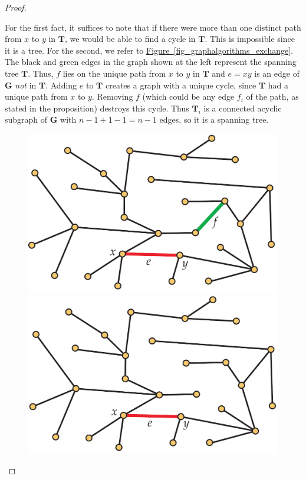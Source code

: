 \documentclass[10pt,]{book}
\theoremstyle{plain}
\theoremstyle{definition}
\theoremstyle{definition}
\theoremstyle{definition}
\theoremstyle{definition}
\numberwithin{equation}{section}
\newlength{\panelmax}
\newcommand{\bfG}{\mathbf{G}}
\newcommand{\bfT}{\mathbf{T}}
\begin{document}
\begin{proof}\hypertarget{proof-6}{}
\hypertarget{p-171}{}%
For the first fact, it suffices to note that if there were more than one distinct path from \(x\) to \(y\) in \(\bfT\), we would be able to find a cycle in \(\bfT\). This is impossible since it is a tree. For the second, we refer to \hyperref[fig_graphalgorithms_exchange]{Figure~\ref{fig_graphalgorithms_exchange}}. The black and green edges in the graph shown at the left represent the spanning tree \(\bfT\). Thus, \(f\) lies on the unique path from \(x\) to \(y\) in \(\bfT\) and \(e=xy\) is an edge of \(\bfG\) \emph{not} in \(\bfT\). Adding \(e\) to \(\bfT\) creates a graph with a unique cycle, since \(\bfT\) had a unique path from \(x\) to \(y\). Removing \(f\) (which could be any edge \(f_i\) of the path, as stated in the proposition) destroys this cycle. Thus \(\bfT_i\) is a connected acyclic subgraph of \(\bfG\) with \(n-1+1-1=n-1\) edges, so it is a spanning tree.%
\begin{figure}
\centering
{%
\setlength{\panelmax}{0pt}
\ifdefined\panelboxAimage\else\newsavebox{\panelboxAimage}\fi%
\begin{lrbox}{\panelboxAimage}
\includegraphics[width=0.48\linewidth]{images/exchange1}
\end{lrbox}
\ifdefined\phAimage\else\newlength{\phAimage}\fi%
\setlength{\phAimage}{\ht\panelboxAimage+\dp\panelboxAimage}
\settototalheight{\phAimage}{\usebox{\panelboxAimage}}
\setlength{\panelmax}{\maxof{\panelmax}{\phAimage}}
\ifdefined\panelboxBimage\else\newsavebox{\panelboxBimage}\fi%
\begin{lrbox}{\panelboxBimage}
\includegraphics[width=0.48\linewidth]{images/exchange2}

\end{lrbox}}
\end{figure}
\end{proof}
\end{document}
